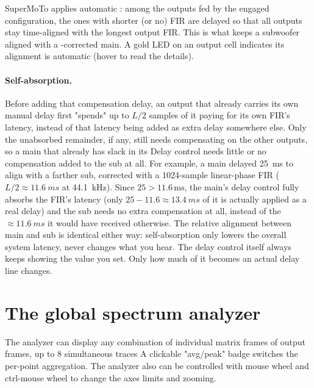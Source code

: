 SuperMoTo applies automatic : among the outputs fed by the engaged configuration, the ones with shorter (or no) FIR are delayed so that all outputs stay time-aligned with the longest output FIR. This is what keeps a subwoofer aligned with a -corrected main. A gold LED on an output cell indicates its alignment is automatic (hover to read the details).

\paragraph{Self-absorption.} Before adding that compensation delay, an output that already carries its own manual delay first "spends" up to $L/2$ samples of it paying for its own FIR's latency, instead of that latency being added as extra delay somewhere else. Only the unabsorbed remainder, if any, still needs compensating on the other outputs, so a main that already has slack in its Delay control needs little or no compensation added to the sub at all. For example, a main delayed \SI{25}{\milli\second}
to align with a farther sub, corrected with a 1024-sample linear-phase FIR ($L/2 \approx \SI{11.6}{ms}$ at \SI{44.1}{\kilo\hertz}). Since $25 > 11.6\,\text{ms}$, the main's delay control fully absorbs the FIR's latency (only $25-11.6\approx\SI{13.4}{ms}$ of it is actually applied as a real
delay) and the sub needs no extra compensation at all, instead of the $\approx\SI{11.6}{ms}$ it would have received otherwise. The relative alignment between main and sub is identical either way: self-absorption only lowers the overall system latency, never changes what you hear. The delay control itself always keeps showing the value you set. Only how much of it becomes an actual delay line changes.


\section{The global spectrum analyzer}
The analyzer can display any combination of individual matrix frames of output frames, up to 8 simultaneous traces A clickable "avg/peak" badge switches the per-point aggregation. The analyzer also can be controlled with mouse wheel and ctrl-mouse wheel to change the axes limits and zooming.

